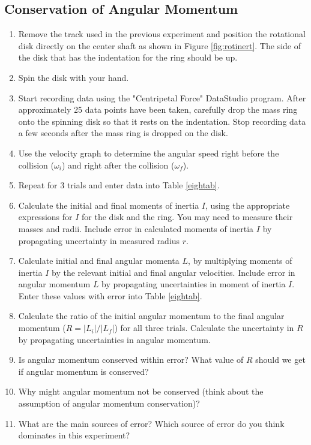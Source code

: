 \subsection{Conservation of Angular Momentum}
\label{diskinert}
\begin{enumerate}
	\item Remove the track used in the previous experiment and position the rotational disk directly on the center shaft as shown in Figure \ref{fig:rotinert}.  The side of the disk that has the indentation for the ring should be up.
	\item Spin the disk with your hand.
	\item Start recording data using the "Centripetal Force" DataStudio program.  After approximately 25 data points have been taken, carefully drop the mass ring onto the spinning disk so that it rests on the indentation. Stop recording data a few seconds after the mass ring is dropped on the disk.
	\item Use the velocity graph to determine the angular speed right before the collision ($\omega _{i}$) and right after the collision ($\omega _{f}$).  
	\item Repeat for 3 trials and enter data into Table \ref{eightab}.
	\item Calculate the initial and final moments of inertia $I$, using the appropriate expressions for $I$ for the disk and the ring. You may need to measure their masses and radii. Include error in calculated moments of inertia $I$ by propagating uncertainty in measured radius $r$.
	\item Calculate initial and final angular momenta $L$, by multiplying moments of inertia $I$ by the relevant initial and final angular velocities. Include error in angular momentum $L$ by propagating uncertainties in moment of inertia $I$. Enter these values with error into Table \ref{eightab}. 
	\item Calculate the ratio of the initial angular momentum to the final angular momentum ($R = |L_i| /|L_f|$) for all three trials. Calculate the uncertainty in $R$ by propagating uncertainties in angular momentum.
	\item Is angular momentum conserved within error? What value of $R$ should we get if angular momentum is conserved? 
	\item Why might angular momentum not be conserved (think about the assumption of angular momentum conservation)?
	\item  What are the main sources of error? Which source of error do you think dominates in this experiment?
\end{enumerate}

